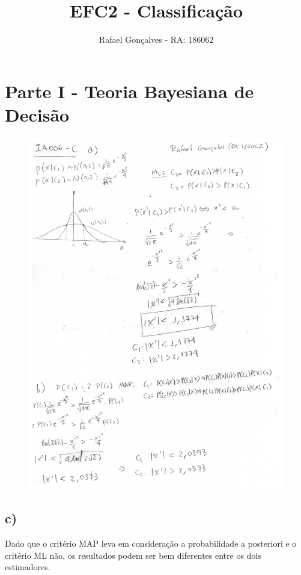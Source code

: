 \documentclass[a4paper, 12pt]{article}
\title{EFC2 - Classificação}
\author{Rafael Gonçalves - RA: 186062}
\date{}
\begin{document}
\maketitle

\section*{Parte I - Teoria Bayesiana de Decisão}

\begin{figure}[h!]
    \centering
    \includegraphics[width=1.0\textwidth]{images/parteI.png}
\end{figure}

\subsection*{c)}

Dado que o critério MAP leva em consideração a probabilidade a posteriori e o critério ML não, os resultados podem ser bem diferentes entre os dois estimadores.
\end{document}
